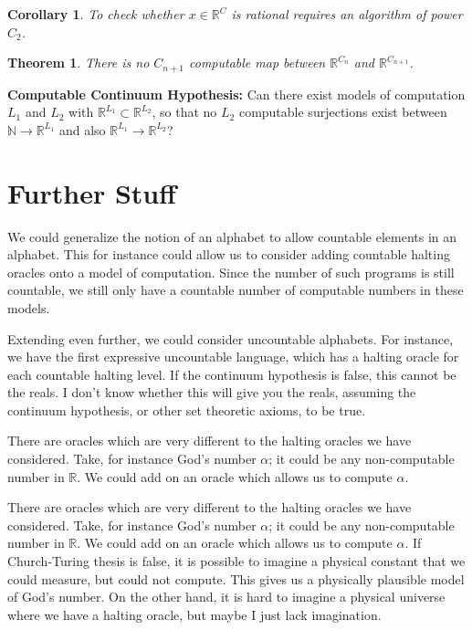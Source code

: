 \documentclass[11pt]{article}
\theoremstyle{plain}
\newtheorem{thm}[prop]{Theorem}
\newtheorem{cly}[prop]{Corollary}
\newcommand{\bb}[1]{\mathbb{#1}}
\newcommand{\bo}[1]{{\bf #1}}
\newcommand{\ra}{\rightarrow}
\newcommand{\ak}{\alpha}        \newcommand{\Ak}{\Alpha}
\begin{document}
\begin{cly}To check whether $x\in\bb R^C$ is rational requires an algorithm of power $C_2$. \end{cly}

\begin{thm}There is no $C_{n+1}$ computable map between $\bb R^{C_n}$ and $\bb R^{C_{n+1}}$.\end{thm}

\bo{Computable Continuum Hypothesis:} Can there exist models of computation $L_1$ and $L_2$ with $\bb R^{L_1}\subset\bb R^{L_2}$, so that no $L_2$ computable surjections exist between $\bb N\ra\bb R^{L_1}$ and also $\bb R^{L_1}\ra \bb R^{L_2}$?


\section{Further Stuff}
We could generalize the notion of an alphabet to allow countable elements in an alphabet. This for instance could allow us to consider adding countable halting oracles onto a model of 
computation. Since the number of such programs is still countable, we still only have a countable number of computable numbers in these models.

Extending even further, we could consider uncountable alphabets. For instance, we have the first expressive uncountable language, which has a halting oracle for each countable halting level. If the continuum hypothesis is false, this cannot be the reals. I don't know whether this will give you the reals, assuming the continuum hypothesis, or other set theoretic axioms, to be true.

There are oracles which are very different to the halting oracles we have considered. Take, for instance God's number $\ak$; it could be any non-computable number in $\bb R$. We could add on an oracle which allows us to compute $\ak$.

There are oracles which are very different to the halting oracles we have considered. Take, for instance God's number $\ak$; it could be any non-computable number in $\bb R$. We could add on an oracle which allows us to compute $\ak$. If Church-Turing thesis is false, it is possible to imagine a physical constant that we could measure, but could not compute. This gives us a physically plausible model of God's number. On the other hand, it is hard to imagine a physical universe where we have a halting oracle, but maybe I just lack imagination.
\end{document}
